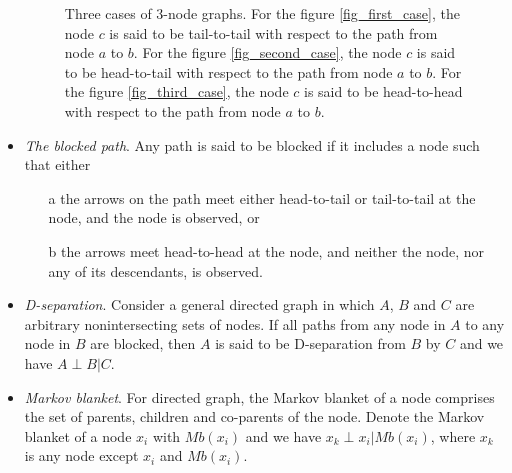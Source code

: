 \documentclass[12pt, a4paper]{article}
\begin{document}
\begin{itemize}
\begin{figure}[htbp]
            \hfil
            \caption{Three cases of 3-node graphs. For the figure \ref{fig_first_case}, the node $c$
            is said to be tail-to-tail with respect to the path from node $a$ to $b$. 
            For the figure \ref{fig_second_case}, the node $c$
            is said to be head-to-tail with respect to the path from node $a$ to $b$.
            For the figure \ref{fig_third_case}, the node $c$
            is said to be head-to-head with respect to the path from node $a$ to $b$.}
            \label{fig:threecases}
        \end{figure}
        \item \textit{The blocked path}. Any path is said to be blocked if it includes a node such that 
        either \begin{itemize}
            \item[a] the arrows on the path meet either head-to-tail or tail-to-tail at the node, and
            the node is observed, or
            \item[b] the arrows meet head-to-head at the node, and neither the node, nor any of its 
            descendants, is observed.  
        \end{itemize}
        \item \textit{D-separation}. Consider a general directed graph in which $A$, $B$ and $C$ are 
        arbitrary nonintersecting sets of nodes. If all paths from any node in $A$ to any node in 
        $B$ are blocked, then $A$ is said to be D-separation from $B$ by $C$ and we have 
        $A\perp B|C$.
        \item \textit{Markov blanket}. For directed graph, the Markov blanket of a node comprises the set of 
        parents, children and co-parents of the node. Denote the Markov blanket of a node $x_i$ with 
        $Mb(x_i)$ and we have $x_k\perp x_i|Mb(x_i)$, where $x_k$ is any node except $x_i$ and 
        $Mb(x_i)$.
    \end{itemize}
\end{document}
